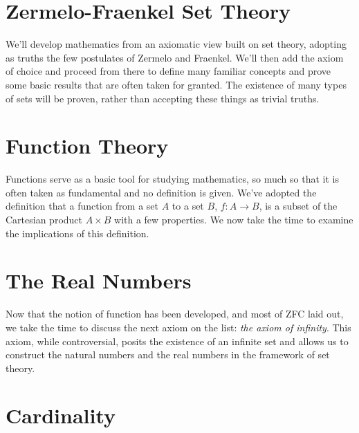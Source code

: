 \begingroup
    \ifcsname\PATH\endcsname
        \newcommand{\PATH}{books/Foundations/ZFC}
        \newcommand{\OLDPATH}{\PATH}
    \else
        \newcommand{\OLDPATH}{\PATH}
        \renewcommand{\PATH}{books/Foundations/ZFC}
    \fi
    \chapter{Zermelo-Fraenkel Set Theory}
        \label{chapt:Zermelo_Fraenkel_Set_Theory}%
        We'll develop mathematics from an axiomatic view built on set theory,
        adopting as truths the few postulates of Zermelo and Fraenkel. We'll
        then add the axiom of choice and proceed from there to define many
        familiar concepts and prove some basic results that are often taken for
        granted. The existence of many types of sets will be proven, rather than
        accepting these things as trivial truths.
        
        
        
    \chapter{Function Theory}
        \label{chapt:Function_Theory}%
        Functions serve as a basic tool for studying mathematics, so much so
        that it is often taken as fundamental and no definition is given. We've
        adopted the definition that a function from a set $A$ to
        a set $B$, $f:A\rightarrow{B}$, is a subset of the Cartesian product
        $A\times{B}$ with a few properties. We now take the time to examine the
        implications of this definition.
        
        
        
        
    \chapter{The Real Numbers}
        Now that the notion of function has been developed, and most of ZFC laid
        out, we take the time to discuss the next axiom on the list:
        \textit{the axiom of infinity}. This axiom,
        while controversial, posits the existence of an infinite set and allows
        us to construct the natural numbers and the real numbers in the
        framework of set theory.
    \chapter{Cardinality}
        
    \renewcommand{\PATH}{\OLDPATH}
\endgroup